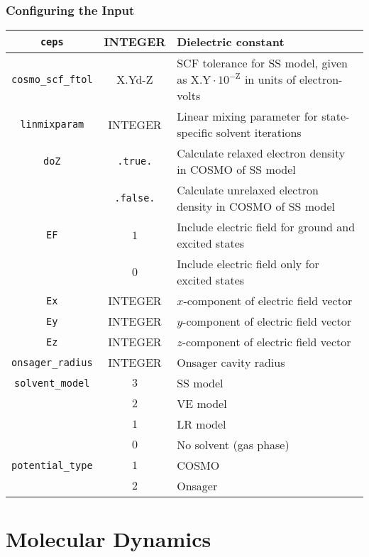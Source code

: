 \documentclass[12pt,letter,footinclude=true,headinclude=true,hyphens,oneside]{book} %
\begin{document}
    \subsection{Configuring the Input}
    \label{solvent-models-input}
    
    \begin{tabular}{ | c | c | p{7cm} | }
    \hline
    \texttt{ceps} & INTEGER & Dielectric constant \\ \hline
    \texttt{cosmo\_scf\_ftol} & X.Yd-Z & SCF tolerance for SS model, given as $\mathrm{X.Y} \cdot 10^{-\mathrm{Z}}$ in units of electron-volts \\ \hline
    \texttt{linmixparam} & INTEGER & Linear mixing parameter for state-specific solvent iterations \\ \hline
    \texttt{doZ} & \texttt{.true.} & Calculate relaxed electron density in COSMO of SS model \\
    & \texttt{.false.} & Calculate unrelaxed electron density in COSMO of SS model \\ \hline
    \texttt{EF} & $1$ & Include electric field for ground and excited states \\
    & $0$ & Include electric field only for excited states \\ \hline
    \texttt{Ex} & INTEGER & $x$-component of electric field vector \\ \hline
    \texttt{Ey} & INTEGER & $y$-component of electric field vector \\ \hline
    \texttt{Ez} & INTEGER & $z$-component of electric field vector \\ \hline
    \texttt{onsager\_radius} & INTEGER & Onsager cavity radius \\ \hline
    \texttt{solvent\_model}
    & $3$ & SS model \\
    & $2$ & VE model \\
    & $1$ & LR model \\
    & $0$ & No solvent (gas phase) \\ \hline
    \texttt{potential\_type} & $1$ & COSMO \\
    & $2$ & Onsager \\
    \hline
    \end{tabular}
    
    \chapter{Molecular Dynamics}
    
    \label{molecular-dynamics-intro}
    
\end{document}
